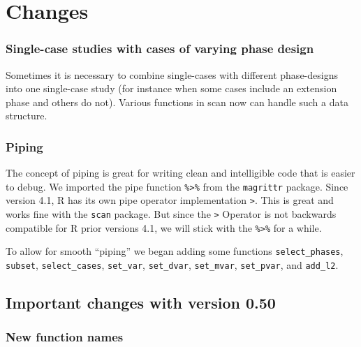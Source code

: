 \documentclass[
  letterpaper,
  DIV=11,
  numbers=noendperiod]{scrreprt}
\begin{document}
\appendix
{}

\hypertarget{changes}{%
\chapter{Changes}\label{changes}}

\hypertarget{single-case-studies-with-cases-of-varying-phase-design}{%
\subsection{Single-case studies with cases of varying phase
design}\label{single-case-studies-with-cases-of-varying-phase-design}}

Sometimes it is necessary to combine single-cases with different
phase-designs into one single-case study (for instance when some cases
include an extension phase and others do not). Various functions in scan
now can handle such a data structure.

\hypertarget{piping}{%
\subsection{Piping}\label{piping}}

The concept of piping is great for writing clean and intelligible code
that is easier to debug. We imported the pipe function
\texttt{\%\textgreater{}\%} from the \texttt{magrittr} package. Since
version 4.1, R has its own pipe operator implementation
\texttt{\textbar{}\textgreater{}}. This is great and works fine with the
\texttt{scan} package. But since the \texttt{\textbar{}\textgreater{}}
Operator is not backwards compatible for R prior versions 4.1, we will
stick with the \texttt{\%\textgreater{}\%} for a while.

To allow for smooth ``piping'' we began adding some functions
\texttt{select\_phases}, \texttt{subset}, \texttt{select\_cases},
\texttt{set\_var}, \texttt{set\_dvar}, \texttt{set\_mvar},
\texttt{set\_pvar}, and \texttt{add\_l2}.

\hypertarget{important-changes-with-version-0.50}{%
\section{Important changes with version
0.50}\label{important-changes-with-version-0.50}}

\hypertarget{new-function-names}{%
\subsection{New function names}\label{new-function-names}}
\end{document}
